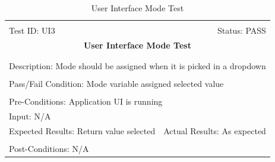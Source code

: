 \documentclass[11pt]{article}
\begin{document}
\begin{center}
\begin{table}[H]
\begin{tabular}{|l r|}\hline&\\[-2mm]
	Test ID: UI3	&Status: PASS \\[-3mm]
	\multicolumn{2}{|c|}{\textbf{\large{User Interface Mode Test}}}\\&\\\hline&\\[-3mm]
	\multicolumn{2}{|p{\textwidth}|}{Description: Mode should be assigned when it is picked in a dropdown}\\[1mm]\hline&\\[-3mm]
	\multicolumn{2}{|p{\textwidth}|}{Pass/Fail Condition: Mode variable assigned selected value}\\[1mm]\hline&\\[-3mm]
	\multicolumn{2}{|p{\textwidth}|}{Pre-Conditions: Application UI is running}\\[4mm]
	\multicolumn{2}{|p{\textwidth}|}{Input: N/A}\\[2mm]\hline
	\multicolumn{1}{|p{0.49\textwidth}}{Expected Results: Return value selected }	&\multicolumn{1}{|p{0.45\textwidth}|}{Actual Results: As expected}\\\hline&\\[-3mm]
	\multicolumn{2}{|p{\textwidth}|}{Post-Conditions: N/A}\\\hline
\end{tabular}
\caption{User Interface Mode Test}
\end{table}
\end{center}
\end{document}
